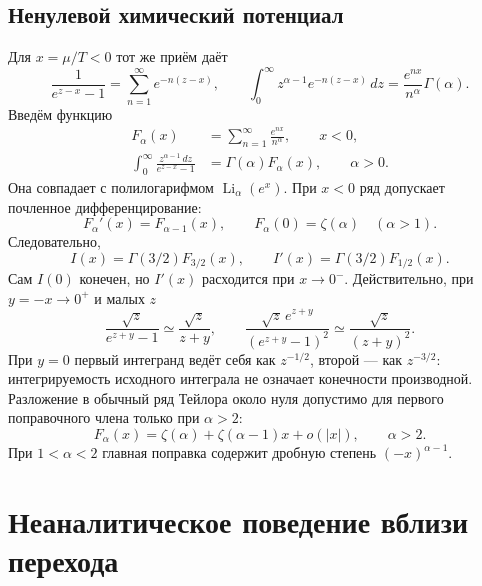 \documentclass[../final.tex]{subfiles}
\begin{document}
\subsection{Ненулевой химический потенциал}
Для $x=\mu/T<0$ тот же приём даёт
\begin{equation*}
 \frac1{e^{z-x}-1}=\sum_{n=1}^{\infty}e^{-n(z-x)},\qquad
 \int_0^\infty z^{\alpha-1}e^{-n(z-x)}\,dz
 =\frac{e^{nx}}{n^\alpha}\Gamma(\alpha).
\end{equation*}
Введём функцию
\begin{align*}
 F_\alpha(x)&=\sum_{n=1}^{\infty}\frac{e^{nx}}{n^\alpha},\qquad x<0,\\
 \int_0^\infty\frac{z^{\alpha-1}\,dz}{e^{z-x}-1}
 &=\Gamma(\alpha)F_\alpha(x),\qquad \alpha>0.
\end{align*}
Она совпадает с полилогарифмом $\operatorname{Li}_\alpha(e^x)$.
При $x<0$ ряд допускает почленное дифференцирование:
\begin{equation*}
 F_\alpha'(x)=F_{\alpha-1}(x),\qquad
 F_\alpha(0)=\zeta(\alpha)\quad(\alpha>1).
\end{equation*}
Следовательно,
\begin{equation*}
 I(x)=\Gamma(3/2)F_{3/2}(x),\qquad
 I'(x)=\Gamma(3/2)F_{1/2}(x).
\end{equation*}
Сам $I(0)$ конечен, но $I'(x)$ расходится при $x\to0^{-}$.
Действительно, при $y=-x\to0^+$ и малых $z$
\begin{equation*}
 \frac{\sqrt z}{e^{z+y}-1}\simeq\frac{\sqrt z}{z+y},\qquad
 \frac{\sqrt z\,e^{z+y}}{(e^{z+y}-1)^2}
 \simeq\frac{\sqrt z}{(z+y)^2}.
\end{equation*}
При $y=0$ первый интегранд ведёт себя как $z^{-1/2}$, второй --- как
$z^{-3/2}$: интегрируемость исходного интеграла не означает конечности производной.
Разложение в обычный ряд Тейлора около нуля допустимо для первого
поправочного члена только при $\alpha>2$:
\begin{equation*}
 F_\alpha(x)=\zeta(\alpha)+\zeta(\alpha-1)x+o(|x|),\qquad\alpha>2.
\end{equation*}
При $1<\alpha<2$ главная поправка содержит дробную степень $(-x)^{\alpha-1}$.

\clearpage
\section{Неаналитическое поведение вблизи перехода}
\end{document}
